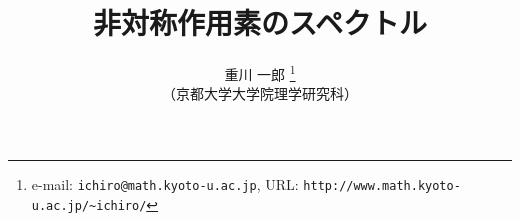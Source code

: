 %
\title{非対称作用素のスペクトル}
%
\author{重川 一郎
\thanks{e-mail: {\tt ichiro@math.kyoto-u.ac.jp},\quad
           URL: {\tt http://www.math.kyoto-u.ac.jp/\~{}ichiro/}}
\\ （京都大学大学院理学研究科）}
\date{}
\maketitle
\setcounter{tocdepth}{2}
